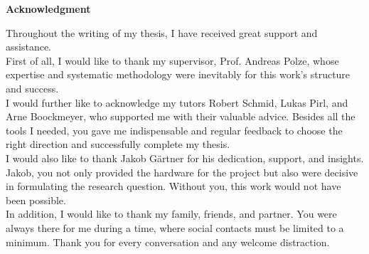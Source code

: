 \vspace*{\fill}
\begin{center}\textsf{\textbf{Acknowledgment}}\end{center}

\noindent Throughout the writing of my thesis, I have received great support and assistance.
\\

\noindent First of all, I would like to thank my supervisor, Prof. Andreas Polze, whose expertise and systematic methodology were inevitably for this work's structure and success.
\\

\noindent I would further like to acknowledge my tutors Robert Schmid, Lukas Pirl, and Arne Boockmeyer, who supported me with their valuable advice.
Besides all the tools I needed, you gave me indispensable and regular feedback to choose the right direction and successfully complete my thesis.
\\

\noindent I would also like to thank Jakob Gärtner for his dedication, support, and insights.
Jakob, you not only provided the hardware for the project but also were decisive in formulating the research question.
Without you, this work would not have been possible.
\\

\noindent In addition, I would like to thank my family, friends, and partner.
You were always there for me during a time, where social contacts must be limited to a minimum.
Thank you for every conversation and any welcome distraction. 


\vspace*{\fill}